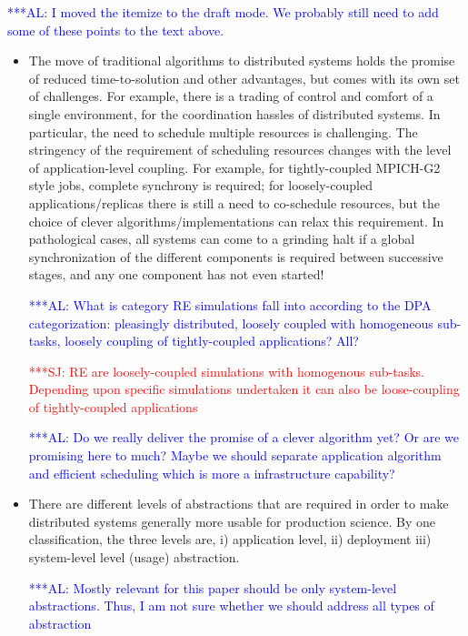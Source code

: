 \documentclass{rspublic}
\newif\ifdraft
\newcommand{\alnote}[1]{ {\textcolor{blue} { ***AL: #1 }}}
\newcommand{\jhanote}[1]{ {\textcolor{red} { ***SJ: #1 }}}
\newcommand{\alnote}[1]{}
\newcommand{\jhanote}[1]{}
\begin{document}
\ifdraft \alnote{I moved the itemize to the draft mode. We probably
  still need to add some of these points to the text above.}
\begin{itemize}
  \item The move of traditional algorithms to distributed systems holds
    the promise of reduced time-to-solution and other advantages, but
    comes with its own set of challenges. For example, there is a
    trading of control and comfort of a single environment, for the
    coordination hassles of distributed systems. In particular, the need
    to schedule multiple resources is challenging. The stringency of the
    requirement of scheduling resources changes with the level of
    application-level coupling. For example, for tightly-coupled
    MPICH-G2 style jobs, complete synchrony is required; for
    loosely-coupled applications/replicas there is still a need to
    co-schedule resources, but the choice of clever
    algorithms/implementations can relax this requirement. In
    pathological cases, all systems can come to a grinding halt if a
    global synchronization of the different components is required
    between successive stages, and any one component has not even
    started!  

    \alnote{What is category RE simulations fall into according to the
      DPA categorization: pleasingly distributed, loosely coupled with
      homogeneous sub-tasks, loosely coupling of tightly-coupled
      applications? All?}
  
    \jhanote{RE are loosely-coupled simulations with homogenous
      sub-tasks. Depending upon specific simulations undertaken it can
      also be loose-coupling of tightly-coupled applications}

    \alnote{Do we really deliver the promise of a clever algorithm
      yet? Or are we promising here to much? Maybe we should separate
      application algorithm and efficient scheduling which is more a
      infrastructure capability?}

  \item There are different levels of abstractions that are required
    in order to make distributed systems generally more usable for
    production science. By one classification, the three levels are,
    i) application level, ii) deployment iii) system-level level
    (usage) abstraction.


    \alnote{Mostly relevant for this paper should be only system-level
      abstractions. Thus, I am not sure whether we should address all
      types of abstraction}


\end{itemize}
\end{document}
